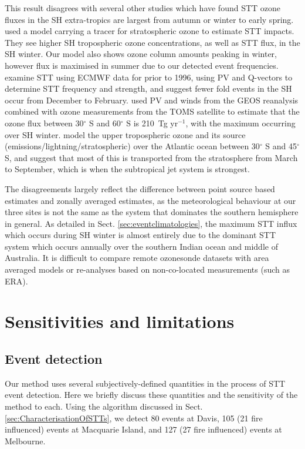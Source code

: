 \documentclass[acp, manuscript]{copernicus} %
\begin{document}
    This result disagrees with several other studies which have found STT ozone fluxes in the SH extra-tropics are largest from autumn or winter to early spring.
    \cite{Roelofs1997} used a model carrying a tracer for stratospheric ozone to estimate STT impacts. 
    They see higher SH tropospheric ozone concentrations, as well as STT flux, in the SH winter.
    Our model also shows ozone column amounts peaking in winter, however flux is maximised in summer due to our detected event frequencies.
    \cite{Elbern1998} examine STT using ECMWF data for prior to 1996, using PV and Q-vectors to determine STT frequency and strength, and suggest fewer fold events in the SH occur from December to February.
    \citet{Olsen2003} used PV and winds from the GEOS reanalysis combined with ozone measurements from the TOMS satellite to estimate that the ozone flux between 30$^{\circ}$ S and 60$^{\circ}$ S is 210~Tg yr$^{-1}$, with the maximum occurring over SH winter.
    \citet{Liu2017} model the upper tropospheric ozone and its source (emissions/lightning/stratospheric) over the Atlantic ocean between 30$^{\circ}$ S and 45$^{\circ}$ S, and suggest that most of this is transported from the stratosphere from March to September, which is when the subtropical jet system is strongest.
    
    The disagreements largely reflect the difference between point source based estimates and zonally averaged estimates, as the meteorological behaviour at our three sites is not the same as the system that dominates the southern hemisphere in general.
    As detailed in Sect. \ref{sec:eventclimatologies}, the maximum STT influx which occurs during SH winter is almost entirely due to the dominant STT system which occurs annually over the southern Indian ocean and middle of Australia.
    It is difficult to compare remote ozonesonde datasets with area averaged models or re-analyses based on non-co-located measurements (such as ERA).
    
\section{Sensitivities and limitations}
\label{sec:sensitivity}
  \subsection{Event detection}
    Our method uses several subjectively-defined quantities in the process of STT event detection.
    Here we briefly discuss these quantities and the sensitivity of the method to each.
    Using the algorithm discussed in Sect. \ref{sec:CharacterisationOfSTTs}, we detect 80 events at Davis, 105 (21 fire influenced) events at Macquarie Island, and 127 (27 fire influenced) events at Melbourne.
    
\end{document}
